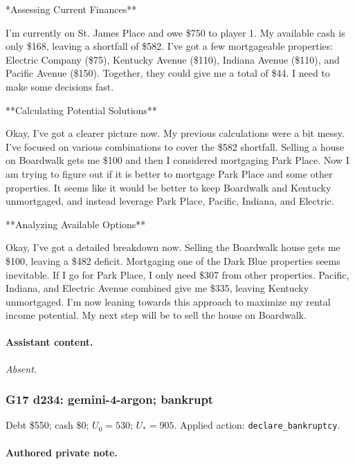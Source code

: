 {\small **Assessing Current Finances**
\par
I'm currently on St. James Place and owe \$750 to player 1. My available cash is only \$168, leaving a shortfall of \$582. I've got a few mortgageable properties: Electric Company (\$75), Kentucky Avenue (\$110), Indiana Avenue (\$110), and Pacific Avenue (\$150). Together, they could give me a total of \$44. I need to make some decisions fast.
\par

**Calculating Potential Solutions**
\par
Okay, I've got a clearer picture now. My previous calculations were a bit messy. I've focused on various combinations to cover the \$582 shortfall. Selling a house on Boardwalk gets me \$100 and then I considered mortgaging Park Place. Now I am trying to figure out if it is better to mortgage Park Place and some other properties. It seems like it would be better to keep Boardwalk and Kentucky unmortgaged, and instead leverage Park Place, Pacific, Indiana, and Electric.
\par

**Analyzing Available Options**
\par
Okay, I've got a detailed breakdown now. Selling the Boardwalk house gets me \$100, leaving a \$482 deficit.  Mortgaging one of the Dark Blue properties seems inevitable. If I go for Park Place, I only need \$307 from other properties. Pacific, Indiana, and Electric Avenue combined give me \$335, leaving Kentucky unmortgaged. I'm now leaning towards this approach to maximize my rental income potential. My next step will be to sell the house on Boardwalk.
\par

\par}

\paragraph{Assistant content.}

\textit{Absent.}

\medskip

\subsubsection*{G17 d234: gemini-4-argon; bankrupt}

Debt \$550; cash \$0; $U_0=530$; $U_*=905$. Applied action: \texttt{declare\_bankruptcy}.

\paragraph{Authored private note.}

